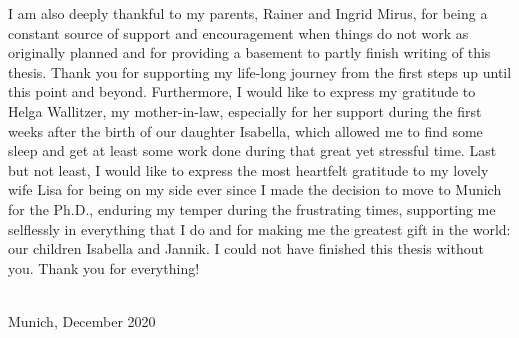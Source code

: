 I am also deeply thankful to my parents, Rainer and Ingrid Mirus, for being a constant source of support and encouragement when things do not work as originally planned and for providing a basement to partly finish writing of this thesis.
Thank you for supporting my life-long journey from the first steps up until this point and beyond.
Furthermore, I would like to express my gratitude to Helga Wallitzer, my mother-in-law, especially for her support during the first weeks after the birth of our daughter Isabella, which allowed me to find some sleep and get at least some work done during that great yet stressful time.
Last but not least, I would like to express the most heartfelt gratitude to my lovely wife Lisa for being on my side ever since I made the decision to move to Munich for the Ph.D., enduring my temper during the frustrating times, supporting me selflessly in everything that I do and for making me the greatest gift in the world: our children Isabella and Jannik.
I could not have finished this thesis without you.
Thank you for everything! 

\vspace{1cm}
\fullname\\
Munich, December 2020
